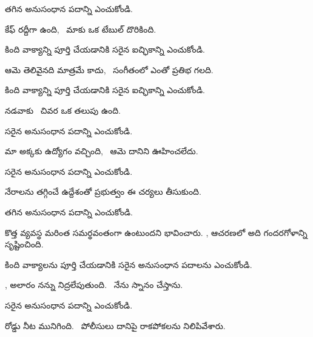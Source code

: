 \begin{questions}
 తగిన అనుసంధాన పదాన్ని  ఎంచుకోండి.\par
కేఫ్ రద్దీగా ఉంది, \blank\ మాకు ఒక టేబుల్ దొరికింది.

 కింది వాక్యాన్ని పూర్తి చేయడానికి సరైన ఐచ్ఛికాన్ని ఎంచుకోండి.\par
ఆమె తెలివైనది మాత్రమే కాదు, \blank\ సంగీతంలో ఎంతో ప్రతిభ గలది.

 కింది వాక్యాన్ని పూర్తి చేయడానికి సరైన ఐచ్ఛికాన్ని ఎంచుకోండి.\par
నడవాకు \blank\ చివర ఒక తలుపు ఉంది.

 సరైన అనుసంధాన పదాన్ని  ఎంచుకోండి.\par
మా అక్కకు ఉద్యోగం వచ్చింది, \blank\ ఆమె దానిని ఊహించలేదు.

 సరైన అనుసంధాన పదాన్ని  ఎంచుకోండి.\par
నేరాలను తగ్గించే ఉద్దేశంతో ప్రభుత్వం ఈ చర్యలు తీసుకుంది.

 తగిన అనుసంధాన పదాన్ని  ఎంచుకోండి.\par
కొత్త వ్యవస్థ మరింత సమర్థవంతంగా ఉంటుందని భావించారు. \blank, ఆచరణలో అది గందరగోళాన్ని సృష్టించింది.

 కింది వాక్యాలను పూర్తి చేయడానికి సరైన అనుసంధాన పదాలను  ఎంచుకోండి.\par
\blank, అలారం నన్ను నిద్రలేపుతుంది. \blank\ నేను స్నానం చేస్తాను.

 సరైన అనుసంధాన పదాన్ని  ఎంచుకోండి.\par
రోడ్డు నీట మునిగింది. \blank\ పోలీసులు దానిపై రాకపోకలను నిలిపివేశారు.


\end{questions}
